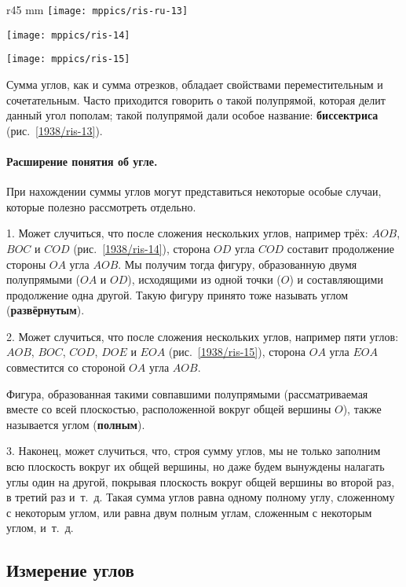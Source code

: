 \begin{wrapfigure}[28]{r}{45 mm}
\centering
\texttt{[image: mppics/ris-ru-13]}
\caption{}\label{1938/ris-13}
\bigskip
\texttt{[image: mppics/ris-14]}
\caption{}\label{1938/ris-14}
\bigskip
\texttt{[image: mppics/ris-15]}
\caption{}\label{1938/ris-15}
\end{wrapfigure}

Сумма углов, как и сумма отрезков, обладает свойствами переместительным и сочетательным.
Часто приходится говорить о такой полупрямой, которая делит данный угол пополам;
такой полупрямой дали особое название:
\textbf{биссектриса} (рис.~\ref{1938/ris-13}).


\paragraph{Расширение понятия об угле.}\label{1938/16}
При нахождении суммы углов могут представиться некоторые особые случаи, которые полезно рассмотреть отдельно.

1.
Может случиться, что после сложения нескольких углов, например трёх:
$AOB$, $BOC$ и $COD$ (рис.~\ref{1938/ris-14}), сторона $OD$ угла $COD$ составит продолжение стороны $OA$ угла $AOB$.
Мы получим тогда фигуру, образованную двумя полупрямыми ($OA$ и $OD$), исходящими из одной точки ($O$) и составляющими продолжение одна другой.
Такую фигуру принято тоже называть углом (\textbf{развёрнутым}).

2.
Может случиться, что после сложения нескольких углов, например пяти углов:
$AOB$, $BOC$, $COD$, $DOE$ и $EOA$ (рис.~\ref{1938/ris-15}), сторона $OA$ угла $EOA$ совместится со стороной $OA$ угла $AOB$.

Фигура, образованная такими совпавшими полупрямыми (рассматриваемая вместе со всей плоскостью, расположенной вокруг общей вершины $O$), также называется углом (\textbf{полным}).


3.
Наконец, может случиться, что, строя сумму углов, мы не только заполним всю плоскость вокруг их общей вершины, но даже будем вынуждены налагать углы один на другой, покрывая плоскость вокруг общей вершины во второй раз, в третий раз и~т.~д.
Такая сумма углов равна одному полному углу, сложенному с некоторым углом, или равна двум полным углам, сложенным с некоторым углом, и~т.~д.

\subsection*{Измерение углов}


